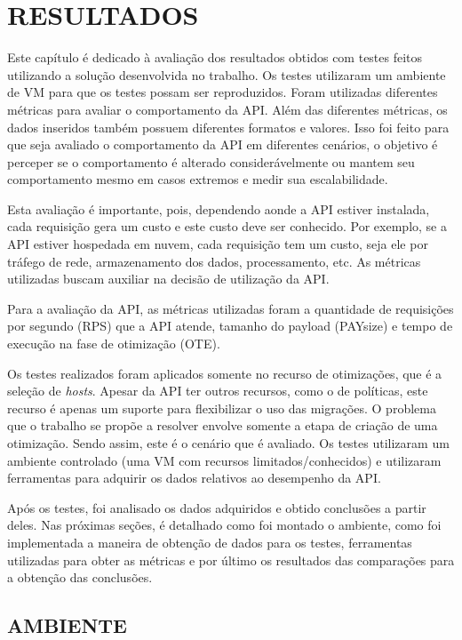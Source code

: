 \chapter{RESULTADOS}
\label{chap:results}

Este capítulo é dedicado à avaliação dos resultados obtidos com testes
feitos utilizando a solução desenvolvida no trabalho. Os testes
utilizaram um ambiente de VM para que os testes possam ser reproduzidos. 
Foram utilizadas diferentes métricas para avaliar
o comportamento da API. Além das diferentes métricas, os dados inseridos 
também possuem diferentes formatos e valores. Isso foi feito para que 
seja avaliado o comportamento da API em diferentes cenários, o objetivo é perceper
se o comportamento é alterado considerávelmente ou mantem seu comportamento
mesmo em casos extremos e medir sua escalabilidade.

Esta avaliação é importante, pois,
dependendo aonde a API estiver instalada, cada requisição gera um custo e este custo 
deve ser conhecido. Por exemplo, se a API estiver hospedada em nuvem, cada requisição tem 
um custo, seja ele por tráfego de rede, armazenamento dos dados, processamento, etc. 
As métricas utilizadas buscam auxiliar na decisão de utilização da API.

Para a avaliação da API, as métricas utilizadas foram a quantidade de requisições por segundo (RPS)
que a API atende, tamanho do payload (PAYsize) e tempo de execução na fase de otimização (OTE).

Os testes realizados foram aplicados somente no recurso de otimizações,
que é a seleção de \textit{hosts}. Apesar da API ter outros recursos, como o de políticas,
este recurso é apenas um suporte para flexibilizar o uso das migrações. O problema 
que o trabalho se propõe a resolver envolve somente a etapa de criação de uma
otimização. Sendo assim, este é o cenário que é avaliado. Os testes utilizaram um 
ambiente controlado (uma VM com recursos limitados/conhecidos) e utilizaram ferramentas para 
adquirir os dados relativos ao desempenho da API.

Após os testes, foi analisado os dados adquiridos e obtido conclusões a partir deles.
Nas próximas seções, é detalhado como foi montado o ambiente, 
como foi implementada a maneira de obtenção de dados para os testes,
ferramentas utilizadas para obter as métricas e por último os resultados das comparações 
para a obtenção das conclusões.

\section{AMBIENTE}

